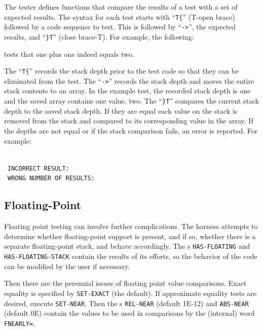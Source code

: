 The tester defines functions that compare the results of a test with
a set of expected results.  The syntax for each test starts with
``\texttt{T\{}'' (T-open brace) followed by a code sequence to test.
This is followed by ``\texttt{->}'', the expected results, and
``\texttt{\}T}'' (close brace-T).  For example, the following:
\begin{quote}
\end{quote}
tests that one plus one indeed equals two.

The ``\texttt{T\{}'' records the stack depth prior to the test code
so that they can be eliminated from the test.
The ``\texttt{->}'' records the stack depth and moves the entire stack
contents to an array.  In the example test, the recorded stack depth
is one and the saved array contains one value, two.
The ``\texttt{\}T}'' compares the current stack depth to the saved
stack depth.  If they are equal each value on the stack is removed
from the stack and compared to its corresponding value in the array.
If the depths are not equal or if the stack comparison fails, an error
is reported.  For example:

 \\
\ \texttt{INCORRECT RESULT:}  \\
\   \texttt{WRONG NUMBER OF RESULTS:}  \\

\subsection{Floating-Point}

Floating point testing can involve further complications.  The harness
attempts to determine whether floating-point support is present, and
if so, whether there is a separate floating-point stack, and behave
accordingly.  The s \texttt{HAS-FLOATING} and
\texttt{HAS-FLOATING-STACK} contain the results of its efforts, so
the behavior of the code can be modified by the user if necessary.

Then there are the perennial issues of floating point value
comparisons.  Exact equality is specified by \texttt{SET-EXACT}
(the default).  If approximate equality tests are desired, execute
\texttt{SET-NEAR}.  Then the \linebreak
{}s \texttt{REL-NEAR} (default 1E-12) and
\texttt{ABS-NEAR} (default 0E) contain the values to be used in
comparisons by the (internal) word \texttt{FNEARLY=}.


